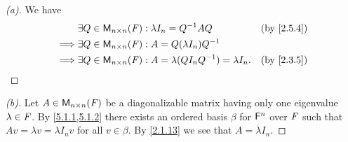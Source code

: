 \begin{proof}[(a)]
	We have
	\begin{align*}
		         & \exists Q \in \ms{n}{n}{\F} : \lambda I_n = Q^{-1} A Q                  &  & \by{2.5.4} \\
		\implies & \exists Q \in \ms{n}{n}{\F} : A = Q (\lambda I_n) Q^{-1}                                \\
		\implies & \exists Q \in \ms{n}{n}{\F} : A = \lambda (Q I_n Q^{-1}) = \lambda I_n. &  & \by{2.3.5}
	\end{align*}
\end{proof}

\begin{proof}[(b)]
	Let \(A \in \mathsf{M}_{{n} \times n}({\mathit{F}})\) be a diagonalizable matrix having only one eigenvalue \(\lambda \in \mathit{F}\).
	By \cref{5.1.1,5.1.2} there exists an ordered basis \(\beta\) for \(\mathsf{F}^n\) over \(\mathit{F}\) such that \(Av = \lambda v = \lambda I_n v\) for all \(v \in \beta\).
	By \cref{2.1.13} we see that \(A = \lambda I_n\).
\end{proof}


